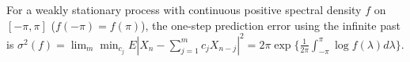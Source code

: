 For a weakly stationary process with continuous positive spectral density $f$ on $[-\pi, \pi]$ ($f(-\pi)=f(\pi)$), the one-step prediction error using the infinite past is $\sigma^2(f) = \lim_m \min_{c_j} E|X_n - \sum_{j=1}^m c_j X_{n-j}|^2 = 2\pi \exp\{\frac{1}{2\pi} \int_{-\pi}^\pi \log f(\lambda) d\lambda\}$.
